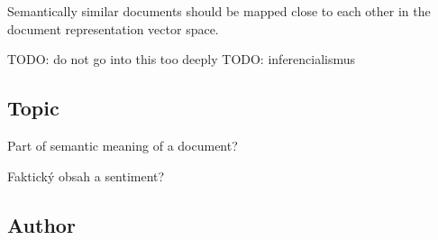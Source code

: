 \begin{repre_prop}\label{repre_prop:similarity-as-proximity}

  Semantically similar documents should be mapped close to each other in the
  document representation vector space.

\end{repre_prop}

TODO: do not go into this too deeply
TODO: inferencialismus
\subsection{Topic}

Part of semantic meaning of a document?

Faktický obsah a sentiment?

\subsection{Author}



